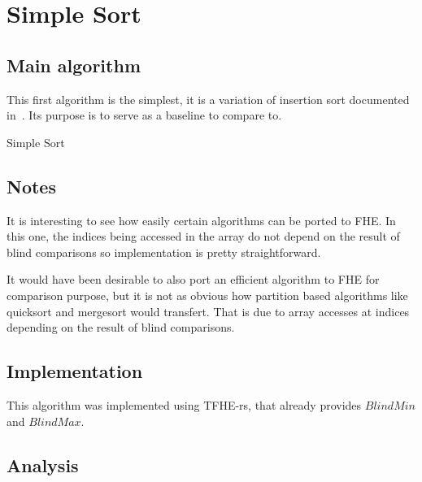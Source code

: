 \documentclass{article}
\begin{document}
\newpage

\section{Simple Sort}

\subsection{Main algorithm}

This first algorithm is the simplest, it is a variation of insertion sort documented in~\cite{fung2021simplest}. Its purpose is to serve as a baseline to compare to.

\begin{algorithm}
    \caption{Simple Sort}
    \begin{algorithmic}
                \EndFor{}
            \EndFor{}
        \EndFunction{}
    \end{algorithmic}
\end{algorithm}

\subsection*{Notes}

It is interesting to see how easily certain algorithms can be ported to FHE. In this one, the indices being accessed in the array do not depend on the result of blind comparisons so implementation is pretty straightforward. 

It would have been desirable to also port an efficient algorithm to FHE for comparison purpose, but it is not as obvious how partition based algorithms like quicksort and mergesort would transfert. That is due to array accesses at indices depending on the result of blind comparisons.

\subsection{Implementation}

This algorithm was implemented using TFHE-rs, that already provides $BlindMin$ and $BlindMax$.

\subsection*{Analysis}
\end{document}
